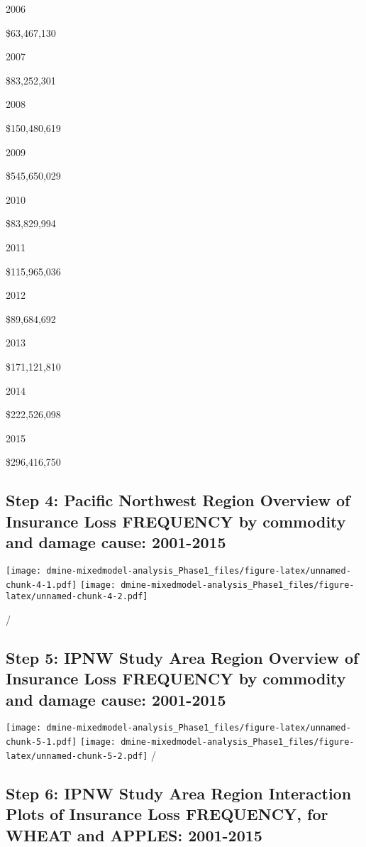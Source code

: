 \documentclass[]{article}
\begin{document}
2006

\$63,467,130

2007

\$83,252,301

2008

\$150,480,619

2009

\$545,650,029

2010

\$83,829,994

2011

\$115,965,036

2012

\$89,684,692

2013

\$171,121,810

2014

\$222,526,098

2015

\$296,416,750

\subsection{Step 4: Pacific Northwest Region Overview of Insurance Loss
FREQUENCY by commodity and damage cause:
2001-2015}\label{step-4-pacific-northwest-region-overview-of-insurance-loss-frequency-by-commodity-and-damage-cause-2001-2015}

\texttt{[image: dmine-mixedmodel-analysis\_Phase1\_files/figure-latex/unnamed-chunk-4-1.pdf]}
\texttt{[image: dmine-mixedmodel-analysis\_Phase1\_files/figure-latex/unnamed-chunk-4-2.pdf]}

/

\subsection{Step 5: IPNW Study Area Region Overview of Insurance Loss
FREQUENCY by commodity and damage cause:
2001-2015}\label{step-5-ipnw-study-area-region-overview-of-insurance-loss-frequency-by-commodity-and-damage-cause-2001-2015}

\texttt{[image: dmine-mixedmodel-analysis\_Phase1\_files/figure-latex/unnamed-chunk-5-1.pdf]}
\texttt{[image: dmine-mixedmodel-analysis\_Phase1\_files/figure-latex/unnamed-chunk-5-2.pdf]}
/

\subsection{Step 6: IPNW Study Area Region Interaction Plots of
Insurance Loss FREQUENCY, for WHEAT and APPLES:
2001-2015}\label{step-6-ipnw-study-area-region-interaction-plots-of-insurance-loss-frequency-for-wheat-and-apples-2001-2015}
\end{document}
